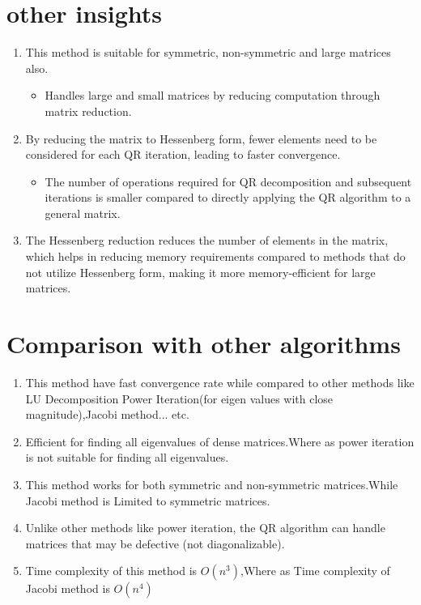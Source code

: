 \documentclass[journal]{IEEEtran}
\begin{document}
\section{\textbf{other insights}}
    \begin{enumerate}
        
        \item This method is suitable for symmetric, non-symmetric and large matrices also.
        \begin{itemize}
            \item Handles large and small matrices by reducing computation through matrix reduction.
        \end{itemize}
        \item By reducing the matrix to Hessenberg form, fewer elements need to be considered for each QR iteration, leading to faster convergence.
        \begin{itemize}
            \item The number of operations required for QR decomposition and subsequent iterations is smaller compared to directly applying the QR algorithm to a general matrix.
        \end{itemize}
        \item The Hessenberg reduction reduces the number of elements in the matrix, which helps in reducing memory requirements compared to methods that do not utilize Hessenberg form, making it more memory-efficient for large matrices.
    \end{enumerate}
    
\section{\textbf{Comparison with other algorithms}}
        \begin{enumerate}
            \item This method have fast convergence rate while compared to other methods like LU Decomposition Power Iteration(for eigen values with close magnitude),Jacobi method... etc.
            \item Efficient for finding all eigenvalues of dense matrices.Where as power iteration is not suitable for finding all eigenvalues.
            \item This method works for both symmetric and non-symmetric matrices.While Jacobi method is Limited to symmetric matrices.
            \item Unlike other methods like power iteration, the QR algorithm can handle matrices that may be defective (not diagonalizable). 
            \item Time complexity of this method is $O(n^3)$,Where as Time complexity of Jacobi method is $O(n^4)$
        \end{enumerate}
   
\end{document}
